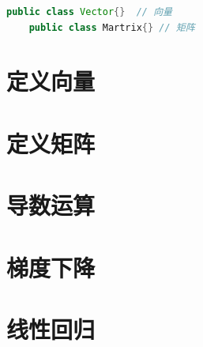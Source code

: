 \begin{lstlisting}[language=Java]
	public class Vector{}  // 向量
	public class Martrix{} // 矩阵
\end{lstlisting}

\section{定义向量}

\section{定义矩阵}

\section{导数运算}

\section{梯度下降}

\section{线性回归}
